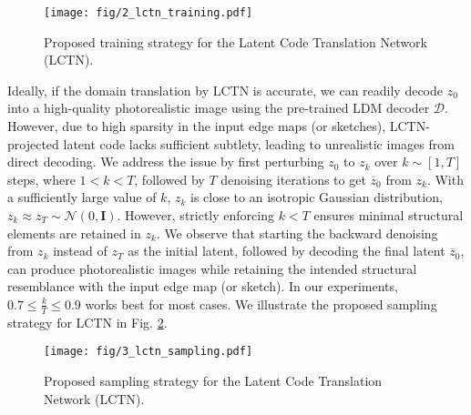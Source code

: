\begin{figure}[h]
  \centering
  \texttt{[image: fig/2\_lctn\_training.pdf]}
  \caption{Proposed training strategy for the Latent Code Translation Network (LCTN).}
  \label{fig:lctn_training}
\end{figure}

\noindent
Ideally, if the domain translation by LCTN is accurate, we can readily decode $z_0$ into a high-quality photorealistic image using the pre-trained LDM decoder $\mathcal{D}$. However, due to high sparsity in the input edge maps (or sketches), LCTN-projected latent code lacks sufficient subtlety, leading to unrealistic images from direct decoding. We address the issue by first perturbing $z_0$ to $z_k$ over $k \sim [1, T]$ steps, where $1 < k < T$, followed by $T$ denoising iterations to get $\overline{z}_0$ from $z_k$. With a sufficiently large value of $k$, $z_k$ is close to an isotropic Gaussian distribution, $z_k \approx z_T \sim \mathcal{N}(0, \mathbf{I})$. However, strictly enforcing $k < T$ ensures minimal structural elements are retained in $z_k$. We observe that starting the backward denoising from $z_k$ instead of $z_T$ as the initial latent, followed by decoding the final latent $\overline{z}_0$, can produce photorealistic images while retaining the intended structural resemblance with the input edge map (or sketch). In our experiments, $0.7 \leqslant \frac{k}{T} \leqslant 0.9$ works best for most cases. We illustrate the proposed sampling strategy for LCTN in Fig. \ref{fig:lctn_sampling}.

\begin{figure}[t]
  \centering
  \texttt{[image: fig/3\_lctn\_sampling.pdf]}
  \caption{Proposed sampling strategy for the Latent Code Translation Network (LCTN).}
  \label{fig:lctn_sampling}
\end{figure}
